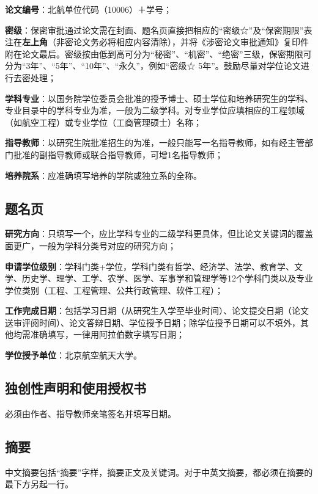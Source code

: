 {\bfseries 论文编号}：北航单位代码（10006）＋学号；

{\bfseries 密级}：保密审批通过论文需在封面、题名页直接把相应的“密级☆”及“保密期限”表注在{\bfseries 左上角}（非密论文务必将相应内容清除），并将《涉密论文审批通知》复印件附在论文最后。密级按由低到高可分为“秘密”、“机密”、“绝密”三级，保密期限可分为“3年”、“5年”、“10年”、“永久”，例如“密级☆ 5年”。鼓励尽量对学位论文进行去密处理；

{\bfseries 学科专业}：以国务院学位委员会批准的授予博士、硕士学位和培养研究生的学科、专业目录中的学科专业为准，一般为二级学科。对专业学位应填相应的工程领域（如航空工程）或专业学位（工商管理硕士）名称；

{\bfseries 指导教师}：以研究生院批准招生的为准，一般只能写一名指导教师，如有经主管部门批准的副指导教师或联合指导教师，可增1名指导教师；

{\bfseries 培养院系}：应准确填写培养的学院或独立系的全称。

\subsection{题名页}

{\bfseries 研究方向}：只填写一个，应比学科专业的二级学科更具体，但比论文关键词的覆盖面更广，一般为学科分类号对应的研究方向；

{\bfseries 申请学位级别}：学科门类+学位，学科门类有哲学、经济学、法学、教育学、文学、历史学、理学、工学、农学、医学、军事学和管理学等12个学科门类以及专业学位类别（工程、工程管理、公共行政管理、软件工程）；

{\bfseries 工作完成日期}：包括学习日期（从研究生入学至毕业时间）、论文提交日期（论文送审评阅时间）、论文答辩日期、学位授予日期；除学位授予日期可以不填外，其他均需准确填写，一律用阿拉伯数字填写日期；

{\bfseries 学位授予单位}：北京航空航天大学。

\subsection{独创性声明和使用授权书}

必须由作者、指导教师亲笔签名并填写日期。

\subsection{摘要}

中文摘要包括“摘要”字样，摘要正文及关键词。对于中英文摘要，都必须在摘要的最下方另起一行。


